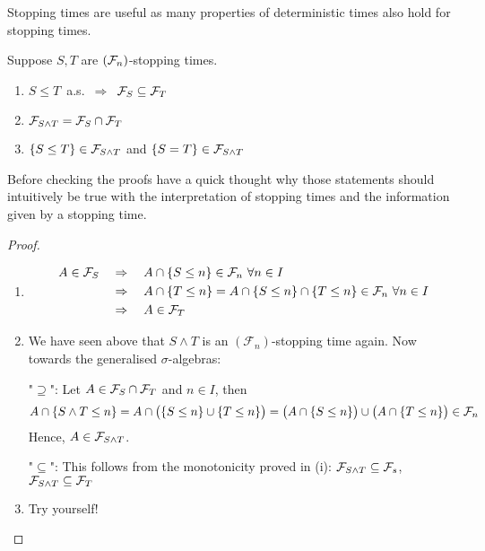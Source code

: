 Stopping times are useful as many properties of deterministic times also hold for stopping times.
\begin{llemma}
\begin{prop}\label{pS}
	Suppose $S, T$ are $(\mathcal{F}_n)$-stopping times.
	\begin{enumerate}[label=(\roman*)]
		\item
			$S \leq T$\, a.s.\, $\Rightarrow\,$ $\mathcal{F}_S \subseteq \mathcal{F}_T$
		\item
			$\mathcal{F}_{S\wedge T} = \mathcal{F}_S \cap \mathcal{F}_T$
		\item
			$\lbrace S \leq T \rbrace \in \mathcal{F}_{S\wedge T}$ and $\lbrace S = T \rbrace \in \mathcal{F}_{S\wedge T}$
	\end{enumerate}
\end{prop}
\end{llemma}
Before checking the proofs have a quick thought why those statements should intuitively be true with the interpretation of stopping times and the information given by a stopping time.
\begin{proof}[Proof]
	\begin{enumerate}[label=(\roman*)]
		\item
			\begin{align*}
				A \in \mathcal{F}_S \quad &\Rightarrow \quad A \cap \lbrace S\leq n \rbrace \in \mathcal{F}_n\,\, \forall n \in I \\
							&\Rightarrow \quad A \cap \lbrace T \leq n \rbrace = A \cap \lbrace S \leq n \rbrace \cap \lbrace T \leq n \rbrace \in \mathcal{F}_n\,\,\forall n \in I\\
							&\Rightarrow  \quad A \in \mathcal{F}_{T}
			\end{align*}
		\item We have seen above that $S\wedge T$ is an $(\mathcal F_n)$-stopping time again. Now towards the generalised $\sigma$-algebras:\smallskip
			
			"$\supseteq$": Let $A\in \mathcal{F}_S\cap\mathcal{F}_T$ and $n\in I$, then 
					\[ A \cap \{ S \wedge T \leq n \} = A \cap \big( \{ S \leq n \} \cup \{ T \leq n \} \big) =\big(A \cap  \{ S \leq n \} \big) \cup \big( A\cap \{ T \leq n \} \big) \in \mathcal{F}_n \]
					Hence, $A \in \mathcal{F}_{S\wedge T}$.\smallskip
				
			"$\subseteq$": This follows from the monotonicity proved in (i): $\mathcal{F}_{S\wedge T} \subseteq \mathcal{F}_s$, $\mathcal{F}_{S\wedge T} \subseteq \mathcal{F}_T$
		\item	Try yourself!		
	\end{enumerate}
\end{proof}
